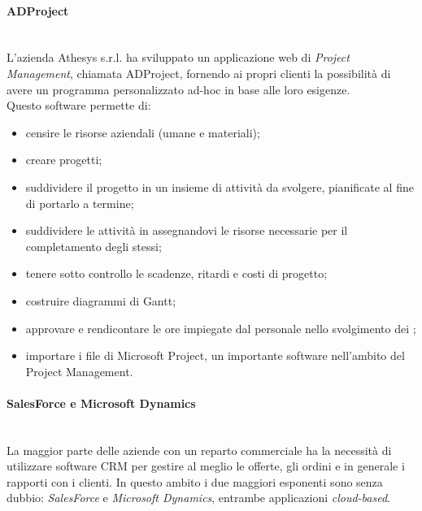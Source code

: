 \documentclass[12pt,a4paper,twoside,openright,english]{book}
\begin{document}
	\paragraph{ADProject}~\\
		L’azienda Athesys s.r.l. ha sviluppato un applicazione web di \textit{Project Management}, chiamata ADProject, fornendo ai propri clienti la possibilità di avere un programma personalizzato ad-hoc in base alle loro esigenze.\\
		Questo software permette di:
		\begin{itemize}
			\itemsep-1em 
			\item censire le risorse aziendali (umane e materiali);
			\item creare progetti;
			\item suddividere il progetto in un insieme di attività da svolgere, pianificate al fine di portarlo a termine;
			\item suddividere le attività in  assegnandovi le risorse necessarie per il completamento degli stessi;
			\item tenere sotto controllo le scadenze, ritardi e costi di progetto;
			\item costruire diagrammi di Gantt;
			\item approvare e rendicontare le ore impiegate dal personale nello svolgimento dei ;
			\item importare i file di Microsoft Project, un importante software nell'ambito del Project Management.
		\end{itemize} 
	\par
	
	\paragraph{SalesForce e Microsoft Dynamics}~\\
		La maggior parte delle aziende con un reparto commerciale ha la necessità di utilizzare software CRM per gestire al meglio le offerte, gli ordini e in generale i rapporti con i clienti. In questo ambito i due maggiori esponenti sono senza dubbio: \textit{SalesForce} e \textit{Microsoft Dynamics}, entrambe applicazioni \textit{cloud-based}.
	\par
	
\end{document}
